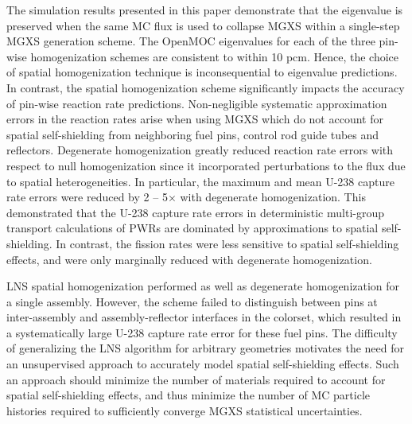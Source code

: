 The simulation results presented in this paper demonstrate that the eigenvalue is preserved when the same MC flux is used to collapse MGXS within a single-step MGXS generation scheme. The OpenMOC eigenvalues for each of the three pin-wise homogenization schemes are consistent to within 10 pcm. Hence, the choice of spatial homogenization technique is inconsequential to eigenvalue predictions. In contrast, the spatial homogenization scheme significantly impacts the accuracy of pin-wise reaction rate predictions. Non-negligible systematic approximation errors in the reaction rates arise when using MGXS which do not account for spatial self-shielding from neighboring fuel pins, control rod guide tubes and reflectors. Degenerate homogenization greatly reduced reaction rate errors with respect to null homogenization since it incorporated perturbations to the flux due to spatial heterogeneities. In particular, the maximum and mean U-238 capture rate errors were reduced by 2 -- 5$\times$ with degenerate homogenization. This demonstrated that the U-238 capture rate errors in deterministic multi-group transport calculations of PWRs are dominated by approximations to spatial self-shielding. In contrast, the fission rates were less sensitive to spatial self-shielding effects, and were only marginally reduced with degenerate homogenization.

LNS spatial homogenization performed as well as degenerate homogenization for a single assembly. However, the scheme failed to distinguish between pins at inter-assembly and assembly-reflector interfaces in the colorset, which resulted in a systematically large U-238 capture rate error for these fuel pins. The difficulty of generalizing the LNS algorithm for arbitrary geometries motivates the need for an unsupervised approach to accurately model spatial self-shielding effects. Such an approach should minimize the number of materials required to account for spatial self-shielding effects, and thus minimize the number of MC particle histories required to sufficiently converge MGXS statistical uncertainties.


